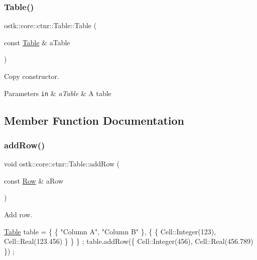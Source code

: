 \subsubsection{\texorpdfstring{Table()}{Table()}\hspace{0.1cm}{\footnotesize\ttfamily [3/3]}}
{\footnotesize\ttfamily ostk\+::core\+::ctnr\+::\+Table\+::\+Table (\begin{DoxyParamCaption}\item[{const \hyperlink{classostk_1_1core_1_1ctnr_1_1_table}{Table} \&}]{a\+Table }\end{DoxyParamCaption})}



Copy constructor. 


\begin{DoxyParams}[1]{Parameters}
\mbox{\tt in}  & {\em a\+Table} & A table \\
\hline
\end{DoxyParams}


\subsection{Member Function Documentation}
\mbox{\label{classostk_1_1core_1_1ctnr_1_1_table_a10f2a23e9bdf2e34ab0b938c40cd1d66}} 
\subsubsection{\texorpdfstring{add\+Row()}{addRow()}}
{\footnotesize\ttfamily void ostk\+::core\+::ctnr\+::\+Table\+::add\+Row (\begin{DoxyParamCaption}\item[{const \hyperlink{classostk_1_1core_1_1ctnr_1_1table_1_1_row}{Row} \&}]{a\+Row }\end{DoxyParamCaption})}



Add row. 


\begin{DoxyCode}
\hyperlink{classostk_1_1core_1_1ctnr_1_1_table_a1b799fa804faf23f9dd4905df90a5cd7}{Table} table = \{ \{ \textcolor{stringliteral}{"Column A"}, \textcolor{stringliteral}{"Column B"} \}, \{ \{ Cell::Integer(123), Cell::Real(123.456) \} \} \} ;
table.addRow(\{ Cell::Integer(456), Cell::Real(456.789) \}) ;
\end{DoxyCode}



